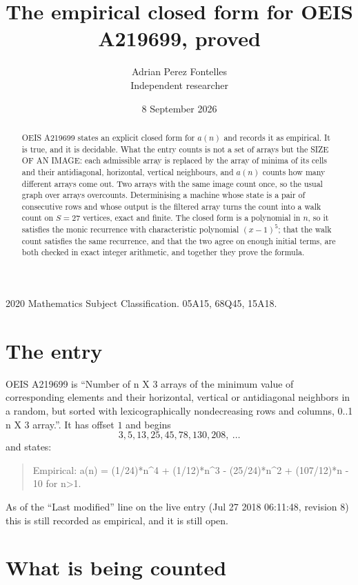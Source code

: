 \documentclass[11pt,a4paper]{article}
\title{The empirical closed form for OEIS A219699, proved}
\author{Adrian Perez Fontelles\\ \small Independent researcher}
\date{8 September 2026}
\theoremstyle{plain}
\theoremstyle{definition}
\begin{document}
\maketitle

\begin{abstract}
OEIS A219699 states an explicit closed form for $a(n)$ and records it as empirical. It is true, and
it is decidable. What the entry counts is not a set of arrays but the SIZE OF AN IMAGE: each
admissible array is replaced by the array of minima of its cells and their antidiagonal, horizontal, vertical neighbours,
and $a(n)$ counts how many different arrays come out. Two arrays with the same image count
once, so the usual graph over arrays overcounts. Determinising a machine whose state is a pair
of consecutive rows and whose output is the filtered array turns the count into a walk count on
$S=27$ vertices, exact and finite. The closed form is a polynomial in $n$, so it satisfies the
monic recurrence with characteristic polynomial $(x-1)^{5}$; that the walk count
satisfies the same recurrence, and that the two agree on enough initial terms, are both checked
in exact integer arithmetic, and together they prove the formula.
\end{abstract}

\noindent\small 2020 Mathematics Subject Classification. 05A15, 68Q45, 15A18.\normalsize

\section{The entry}

OEIS A219699 is ``Number of n X 3 arrays of the minimum value of corresponding elements and their horizontal, vertical or antidiagonal neighbors in a random, but sorted with lexicographically nondecreasing rows and columns, 0..1 n X 3 array.''. It has offset $1$ and begins
\[
3, 5, 13, 25, 45, 78, 130, 208,\ \dots
\]
and states:
\begin{quote}
Empirical: a(n) = (1/24)*n\^{}4 + (1/12)*n\^{}3 - (25/24)*n\^{}2 + (107/12)*n - 10 for n>1.
\end{quote}
As of the ``Last modified'' line on the live entry (Jul 27 2018 06:11:48, revision 8)
this is still recorded as empirical, and it is still open.

\section{What is being counted}
\end{document}
